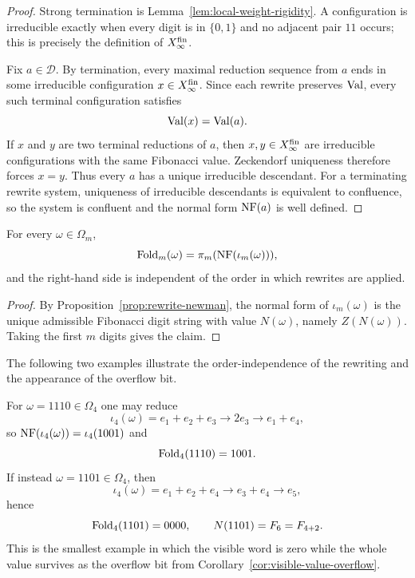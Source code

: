 \begin{proof}
Strong termination is Lemma~\ref{lem:local-weight-rigidity}.  A configuration
is irreducible exactly when every digit is in $\{0,1\}$ and no adjacent pair
$11$ occurs; this is precisely the definition of $X_\infty^{\mathrm{fin}}$.

Fix $a\in\mathcal D$.  By termination, every maximal reduction sequence from
$a$ ends in some irreducible configuration $x\in X_\infty^{\mathrm{fin}}$.  Since each rewrite
preserves $\operatorname{Val}$, every such terminal configuration satisfies
\[
\operatorname{Val}(x)=\operatorname{Val}(a).
\]
If $x$ and $y$ are two terminal reductions of $a$, then $x,y\in X_\infty^{\mathrm{fin}}$ are
irreducible configurations with the same Fibonacci value.  Zeckendorf
uniqueness therefore forces $x=y$.  Thus every $a$ has a unique irreducible
descendant.  For a terminating rewrite system, uniqueness of irreducible
descendants is equivalent to confluence, so the system is confluent and the
normal form $\operatorname{NF}(a)$ is well defined.
\end{proof}

\begin{corollary}
\label{cor:fold-order-independent}
For every $\omega\in\Omega_m$,
\[
\operatorname{Fold}_m(\omega)=\pi_m(\operatorname{NF}(\iota_m(\omega))),
\]
and the right-hand side is independent of the order in which rewrites are
applied.
\end{corollary}

\begin{proof}
By Proposition~\ref{prop:rewrite-newman}, the normal form of $\iota_m(\omega)$
is the unique admissible Fibonacci digit string with value $N(\omega)$, namely
$Z(N(\omega))$.  Taking the first $m$ digits gives the claim.
\end{proof}

\begin{remark}
\label{rem:two-fold-examples}
The following two examples illustrate the order-independence of the rewriting
and the appearance of the overflow bit.

For $\omega=1110\in\Omega_4$ one may reduce
\[
\iota_4(\omega)=e_1+e_2+e_3\to 2e_3\to e_1+e_4,
\]
so $\operatorname{NF}(\iota_4(\omega))=\iota_4(1001)$ and
\[
\operatorname{Fold}_4(1110)=1001.
\]
If instead $\omega=1101\in\Omega_4$, then
\[
\iota_4(\omega)=e_1+e_2+e_4\to e_3+e_4\to e_5,
\]
hence
\[
\operatorname{Fold}_4(1101)=0000,
\qquad
N(1101)=F_6=F_{4+2}.
\]
This is the smallest example in which the visible word is zero while the whole
value survives as the overflow bit from
Corollary~\ref{cor:visible-value-overflow}.
\end{remark}

